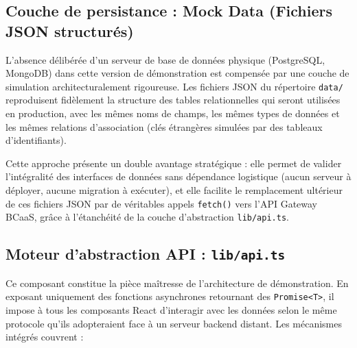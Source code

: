 \documentclass[12pt,a4paper]{report}
\begin{document}
\subsection{Couche de persistance : Mock Data (Fichiers JSON structurés)}

L'absence délibérée d'un serveur de base de données physique (PostgreSQL, MongoDB) dans cette version de démonstration est compensée par une couche de simulation architecturalement rigoureuse. Les fichiers JSON du répertoire \texttt{data/} reproduisent fidèlement la structure des tables relationnelles qui seront utilisées en production, avec les mêmes noms de champs, les mêmes types de données et les mêmes relations d'association (clés étrangères simulées par des tableaux d'identifiants).

Cette approche présente un double avantage stratégique : elle permet de valider l'intégralité des interfaces de données sans dépendance logistique (aucun serveur à déployer, aucune migration à exécuter), et elle facilite le remplacement ultérieur de ces fichiers JSON par de véritables appels \texttt{fetch()} vers l'API Gateway BCaaS, grâce à l'étanchéité de la couche d'abstraction \texttt{lib/api.ts}.

\subsection{Moteur d'abstraction API : \texttt{lib/api.ts}}

Ce composant constitue la pièce maîtresse de l'architecture de démonstration. En exposant uniquement des fonctions asynchrones retournant des \texttt{Promise<T>}, il impose à tous les composants React d'interagir avec les données selon le même protocole qu'ils adopteraient face à un serveur backend distant. Les mécanismes intégrés couvrent :
\end{document}

